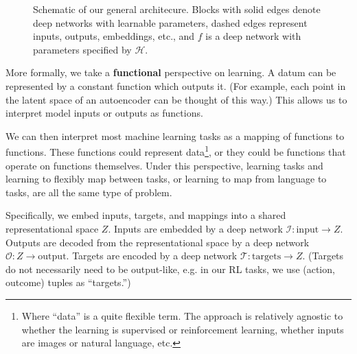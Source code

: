 \documentclass[11pt]{article}
\begin{document}
\begin{figure}
\caption{Schematic of our general architecure. Blocks with solid edges denote deep networks with learnable parameters, dashed edges represent inputs, outputs, embeddings, etc., and $f$ is a deep network with parameters specified by $\mathcal{H}$.} \label{architecture_fig}
\end{figure}
More formally, we take a \textbf{functional} perspective on learning. A datum can be represented by a constant function which outputs it. (For example, each point in the latent space of an autoencoder can be thought of this way.) This allows us to interpret model inputs or outputs as functions. \par
We can then interpret most machine learning tasks as a mapping of functions to functions. These functions could represent data\footnote{Where ``data'' is a quite flexible term. The approach is relatively agnostic to whether the learning is supervised or reinforcement learning, whether inputs are images or natural language, etc.}, or they could be functions that operate on functions themselves. Under this perspective, learning tasks and learning to flexibly map between tasks, or learning to map from language to tasks, are all the same type of problem. \par
Specifically, we embed inputs, targets, and mappings into a shared representational space $Z$. Inputs are embedded by a deep network $\mathcal{I}: \text{input} \rightarrow Z$. Outputs are decoded from the representational space by a deep network $\mathcal{O}: Z \rightarrow \text{output}$. Targets are encoded by a deep network $\mathcal{T}: \text{targets} \rightarrow Z$. (Targets do not necessarily need to be output-like, e.g. in our RL tasks, we use (action, outcome) tuples as ``targets.'') \par
\end{document}
